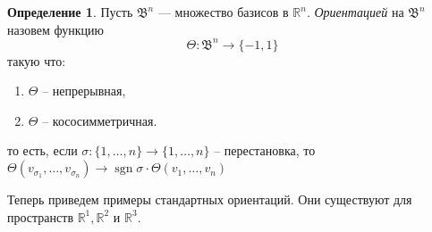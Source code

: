 \documentclass[a5paper]{article}
\newcounter{through}
\theoremstyle{plain}
\theoremstyle{definition}
\newtheorem{definition}[through]{Определение}
\numberwithin{through}{section}
\numberwithin{equation}{section}
\DeclareMathOperator{\sgn}{sgn}
\begin{document}
\begin{definition}\label{OrientationInRn}
	Пусть $\mathfrak{B}^n$ --- множество базисов в $\mathbb{R}^n$.
	\textit{Ориентацией} на $\mathfrak{B}^n$ назовем функцию 
	\[ \Theta: \mathfrak{B}^n \to \{-1, 1 \} \]
	такую что:
	\begin{enumerate}
		\item 
		$\Theta$ -- непрерывная,
		
		\item
		$\Theta$ -- кососимметричная.
		

	\end{enumerate}
		то есть, если $\sigma : \{ 1,\ldots, n \} \to \{ 1,\ldots, n \}$ -- перестановка, то 
$\Theta(v_{\sigma_1},\ldots, v_{\sigma_n}) \to 
\sgn \sigma \cdot\Theta(v_{1},\ldots, v_{n})$
\end{definition}

Теперь приведем примеры стандартных ориентаций. 
Они существуют для пространств $\mathbb{R}^1, \mathbb{R}^2$ и $\mathbb{R}^3$.
\end{document}
